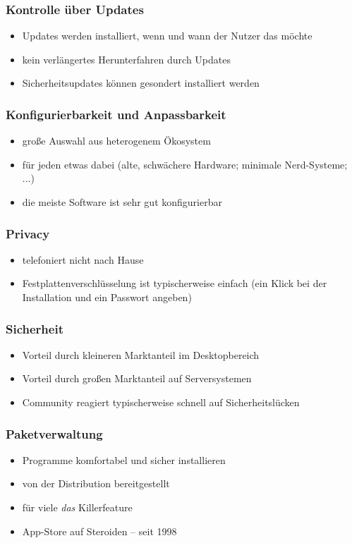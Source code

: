 \documentclass[t]{beamer}
\begin{document}
\begin{frame}
  \frametitle{Kontrolle über Updates}
  \begin{itemize}
  \item Updates werden installiert, wenn und wann der Nutzer das möchte
  \item kein verlängertes Herunterfahren durch Updates
  \item Sicherheitsupdates können gesondert installiert werden
  \end{itemize}
\end{frame}

\begin{frame}
  \frametitle{Konfigurierbarkeit und Anpassbarkeit}
  \begin{itemize}
  \item große Auswahl aus heterogenem Ökosystem
  \item für jeden etwas dabei (alte, schwächere Hardware; minimale
    Nerd-Systeme; ...)
  \item die meiste Software ist sehr gut konfigurierbar
  \end{itemize}
\end{frame}

\begin{frame}
  \frametitle{Privacy}
  \begin{itemize}
  \item telefoniert nicht nach Hause
  \item Festplattenverschlüsselung ist typischerweise einfach (ein
    Klick bei der Installation und ein Passwort angeben)
  \end{itemize}
\end{frame}

\begin{frame}
  \frametitle{Sicherheit}
  \begin{itemize}
  \item Vorteil durch kleineren Marktanteil im Desktopbereich
  \item Vorteil durch großen Marktanteil auf Serversystemen
  \item Community reagiert typischerweise schnell auf
    Sicherheitslücken
  \end{itemize}
\end{frame}

\begin{frame}
  \frametitle{Paketverwaltung}
  \begin{itemize}
  \item Programme komfortabel und sicher installieren
  \item von der Distribution bereitgestellt
  \item für viele \emph{das} Killerfeature
  \item App-Store auf Steroiden – seit 1998
  \end{itemize}
\end{frame}
\end{document}
